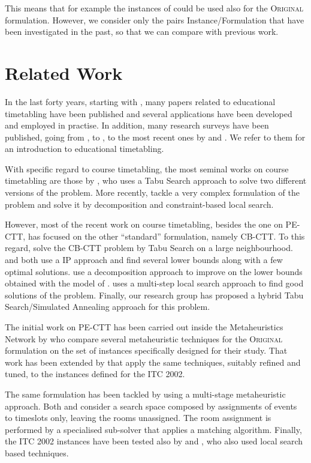 \documentclass[authoryear,preprint,a4paper,12pt]{elsarticle}
\begin{document}
This means that for example the instances of \citet{LePa05} could be
used also for the \textsc{Original} formulation. However, we consider
only the pairs Instance/Formulation that have been investigated in the
past, so that we can compare with previous work.

\section{Related Work}

In the last forty years, starting with \citet{Gotl63}, many papers
related to educational timetabling have been published and several
applications have been developed and employed in practise.  In
addition, many research surveys have been published, going from
\citet{Werr85}, to \citet{Scha99}, to the most recent ones by
\cite{BuPe02} and \cite{Lewi08}. We refer to them for an
introduction to educational timetabling.

With specific regard to course timetabling, the most seminal
works on course timetabling are those by
\citet{Hert91,Hert92}, who uses a Tabu Search approach to solve two
different versions of the problem. More recently, 
\citet{MuMR07} tackle a very complex formulation of the problem and
solve it by decomposition and constraint-based local search. 

However, most of the recent work on course timetabling, besides the
one on PE-CTT, has focused on the other ``standard''
formulation, namely CB-CTT.  To this regard, \citet{LuHa09} solve the
CB-CTT problem by Tabu Search on a large neighbourhood. \citet{LaLu10}
and \citet{BMPR10} both use a IP approach and find several lower
bounds along with a few optimal solutions.  \citet{HaBe11} use a
decomposition approach to improve on the lower bounds obtained with
the model of \citet{LaLu10}.  \cite{Mull09} uses a multi-step local
search approach to find good solutions of the problem. Finally, our
research group \citep{BeDS11} has proposed a hybrid Tabu
Search/Simulated Annealing approach for this problem.

The initial work on PE-CTT has been carried out inside the
Metaheuristics Network by \citet{RSBC03} who compare several
metaheuristic techniques for the \textsc{Original} formulation on
the set of instances specifically designed for their study. That work
has been extended by \citet{CBSR06} that apply the same techniques,
suitably refined and tuned, to the instances defined for the ITC 2002.

The same formulation has been tackled by \citet{Kost04} using a
multi-stage metaheuristic approach. Both \citeauthor{Kost04} and
\citeauthor{CBSR06} consider a search space composed by assignments of
events to timeslots only, leaving the rooms unassigned. The room
assignment is performed by a specialised sub-solver that applies a
matching algorithm. Finally, the ITC 2002 instances have been tested
also by \citet{BBNP03} and \citet{DiSc06}, who also used local search
based techniques.
\end{document}
